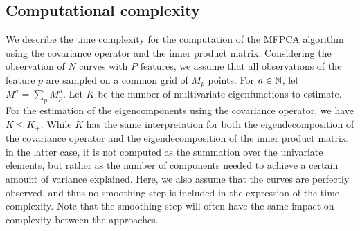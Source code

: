 

\subsection{Computational complexity} %
\label{sub:computational_complexity}

We describe the time complexity for the computation of the MFPCA algorithm using the covariance operator and the inner product matrix. Considering the observation of $N$ curves with $P$ features, we assume that all observations of the feature $p$ are sampled on a common grid of $M_p$ points. For $a \in \mathbb{N}$, let $M^a = \sum_{p} M_p^a$. Let $K$ be the number of multivariate eigenfunctions to estimate. For the estimation of the eigencomponents using the covariance operator, we have $K \leq K_+$. While $K$ has the same interpretation for both the eigendecomposition of the covariance operator and the eigendecomposition of the inner product matrix, in the latter case, it is not computed as the summation over the univariate elements, but rather as the number of components needed to achieve a certain amount of variance explained. Here, we also assume that the curves are perfectly observed, and thus no smoothing step is included in the expression of the time complexity. Note that the smoothing step will often have the same impact on complexity between the approaches.

